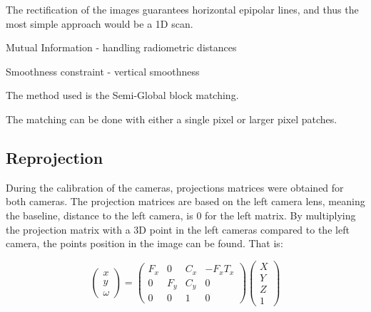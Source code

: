 The rectification of the images guarantees horizontal epipolar lines, and thus the most simple approach would be a 1D scan. 

Mutual Information - handling radiometric distances

Smoothness constraint - vertical smoothness





The method used is the Semi-Global block matching.


The matching can be done with either a single pixel or larger pixel patches.


\subsection{Reprojection} \label{sec:reprojection}

During the calibration of the cameras, projections matrices were obtained for both cameras. The projection matrices are based on the left camera lens, meaning the baseline, distance to the left camera, is 0 for the left matrix. By multiplying the projection matrix with a 3D point in the left cameras  compared to the left camera, the points position in the image can be found. That is:

\[ 
\begin{pmatrix}
  x \\
  y \\
  \omega 
 \end{pmatrix}	
 = 
 \begin{pmatrix}
  F_{x} & 0 & C_{x} & -F_{x}T_{x} \\
  0 & F_{y} & C_{y} & 0 \\
  0 & 0 & 1 & 0
 \end{pmatrix}
 \begin{pmatrix}
  X \\
  Y \\
  Z \\
  1 
 \end{pmatrix}	
\]

